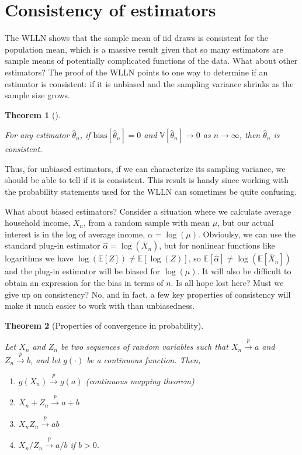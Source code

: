 \documentclass[
  letterpaper,
  DIV=11,
  numbers=noendperiod]{scrreprt}
\providecommand{\tightlist}{%
  \setlength{\itemsep}{0pt}\setlength{\parskip}{0pt}}\usepackage{longtable,booktabs,array}
\newcommand{\E}{\mathbb{E}}
\newcommand{\V}{\mathbb{V}}
\newcommand{\Xbar}{\overline{X}}
\newcommand{\inprob}{\overset{p}{\to}}
\theoremstyle{definition}
\theoremstyle{plain}
\newtheorem{theorem}{Theorem}[chapter]
\theoremstyle{definition}
\theoremstyle{remark}
\begin{document}
\hypertarget{consistency-of-estimators}{%
\section{Consistency of estimators}\label{consistency-of-estimators}}

The WLLN shows that the sample mean of iid draws is consistent for the
population mean, which is a massive result given that so many estimators
are sample means of potentially complicated functions of the data. What
about other estimators? The proof of the WLLN points to one way to
determine if an estimator is consistent: if it is unbiased and the
sampling variance shrinks as the sample size grows.

\begin{theorem}[]\protect\hypertarget{thm-consis}{}\label{thm-consis}

For any estimator \(\widehat{\theta}_n\), if
\(\text{bias}[\widehat{\theta}_n] = 0\) and
\(\V[\widehat{\theta}_n] \rightarrow 0\) as \(n\rightarrow \infty\),
then \(\widehat{\theta}_n\) is consistent.

\end{theorem}

Thus, for unbiased estimators, if we can characterize its sampling
variance, we should be able to tell if it is consistent. This result is
handy since working with the probability statements used for the WLLN
can sometimes be quite confusing.

What about biased estimators? Consider a situation where we calculate
average household income, \(\Xbar_n\), from a random sample with mean
\(\mu\), but our actual interest is in the log of average income,
\(\alpha = \log(\mu)\). Obvioulsy, we can use the standard plug-in
estimator \(\widehat{\alpha} = \log(\Xbar_n)\), but for nonlinear
functions like logarithms we have
\(\log\left(\E[Z]\right) \neq \E[\log(Z)]\), so
\(\E[\widehat{\alpha}] \neq \log(\E[\Xbar_n])\) and the plug-in
estimator will be biased for \(\log(\mu)\). It will also be difficult to
obtain an expression for the bias in terms of \(n\). Is all hope lost
here? Must we give up on consistency? No, and in fact, a few key
properties of consistency will make it much easier to work with than
unbiasedness.

\begin{theorem}[Properties of convergence in
probability]\protect\hypertarget{thm-inprob-properties}{}\label{thm-inprob-properties}

Let \(X_n\) and \(Z_n\) be two sequences of random variables such that
\(X_n \inprob a\) and \(Z_n \inprob b\), and let \(g(\cdot)\) be a
continuous function. Then,

\begin{enumerate}
\def\labelenumi{\arabic{enumi}.}
\tightlist
\item
  \(g(X_n) \inprob g(a)\) (continuous mapping theorem)
\item
  \(X_n + Z_n \inprob a + b\)
\item
  \(X_nZ_n \inprob ab\)
\item
  \(X_n/Z_n \inprob a/b\) if \(b > 0\).
\end{enumerate}

\end{theorem}
\end{document}
